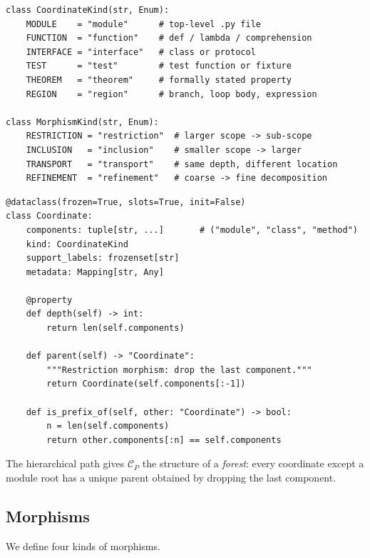 \documentclass[11pt]{article}
\begin{document}
\begin{lstlisting}[style=jugeo-python,caption={Coordinate and morphism types
  from the \JuGeo{} codebase (\texttt{geometry/site.py}).},label=lst:kinds]
class CoordinateKind(str, Enum):
    MODULE    = "module"      # top-level .py file
    FUNCTION  = "function"    # def / lambda / comprehension
    INTERFACE = "interface"   # class or protocol
    TEST      = "test"        # test function or fixture
    THEOREM   = "theorem"     # formally stated property
    REGION    = "region"      # branch, loop body, expression

class MorphismKind(str, Enum):
    RESTRICTION = "restriction"  # larger scope -> sub-scope
    INCLUSION   = "inclusion"    # smaller scope -> larger
    TRANSPORT   = "transport"    # same depth, different location
    REFINEMENT  = "refinement"   # coarse -> fine decomposition
\end{lstlisting}

\begin{lstlisting}[style=jugeo-python,caption={The \texttt{Coordinate}
  dataclass.},label=lst:coord]
@dataclass(frozen=True, slots=True, init=False)
class Coordinate:
    components: tuple[str, ...]       # ("module", "class", "method")
    kind: CoordinateKind
    support_labels: frozenset[str]
    metadata: Mapping[str, Any]

    @property
    def depth(self) -> int:
        return len(self.components)

    def parent(self) -> "Coordinate":
        """Restriction morphism: drop the last component."""
        return Coordinate(self.components[:-1])

    def is_prefix_of(self, other: "Coordinate") -> bool:
        n = len(self.components)
        return other.components[:n] == self.components
\end{lstlisting}

The hierarchical path gives $\mathcal{C}_P$ the structure of a \emph{forest}:
every coordinate except a module root has a unique parent obtained by dropping
the last component.

\subsection{Morphisms}

We define four kinds of morphisms.
\end{document}
